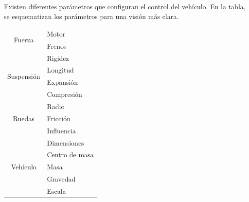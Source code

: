 \documentclass[10pt,a4paper,hidelinks]{article}
\begin{document}
Existen diferentes parámetros que configuran el control del vehículo.
En la tabla, se esquematizan los parámetros para una visión más clara.
\begin{center}
\begin{tabular}{ | c | l | }
	\hline
	\multirow{2}{*}{Fuerza}
	& Motor \\
	& Frenos \\
	\hline
	\multirow{4}{*}{Suspensión}
	& Rigidez \\
	& Longitud \\
	& Expansión \\
	& Compresión \\
	\hline
	\multirow{3}{*}{Ruedas}
	& Radio \\
	& Fricción \\
	& Influencia \\
	\hline
	\multirow{5}{*}{Vehículo}
	& Dimensiones \\
	& Centro de masa \\
	& Masa \\
	& Gravedad \\
	& Escala \\
	\hline
\end{tabular}
\end{center}
\end{document}
